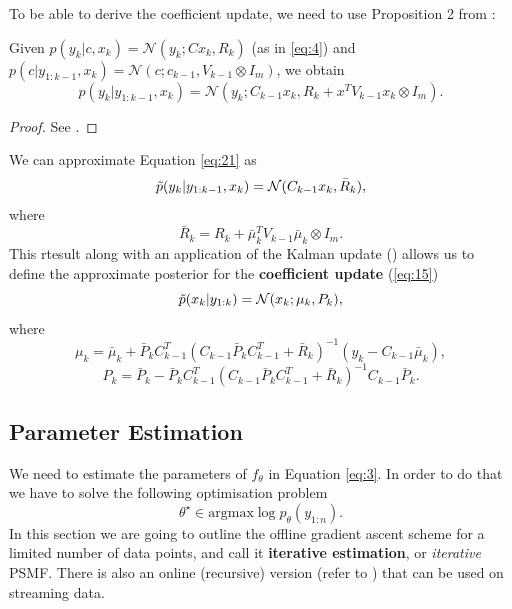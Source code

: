 \documentclass{mldsmsc}
\begin{document}
\noindent To be able to derive the coefficient update, we need to use Proposition 2 from \cite{akyildiz2021probabilistic}:
\begin{proposition}
    Given $p(y_k | c, x_k) = \mathcal{N}(y_k; Cx_k, R_k)$ (as in \ref{eq:4}) and $p(c | y_{1:k-1}, x_k) = \mathcal{N}(c; c_{k-1}, V_{k-1} \otimes I_m)$, we obtain
    \begin{equation}\label{eq:21}
        p(y_k | y_{1:k-1}, x_k) = \mathcal{N}(y_k; C_{k-1} x_k, R_k + x^T V_{k-1} x_k \otimes I_m).
    \end{equation}
\end{proposition}
\begin{proof}
    See \cite{akyildiz2021probabilistic}.
\end{proof}\newline

\noindent We can approximate Equation \ref{eq:21} as
\begin{equation}
    \Tilde{p}(y_k | y_{1:k-1}, x_k) = \mathcal{N}(C_{k-1} x_k, \bar{R}_k),
\end{equation}
where
\begin{equation}
    \bar{R}_k = R_k + \bar{\mu}_k^T V_{k-1} \bar{\mu}_k \otimes I_m.
\end{equation}
This rtesult along with an application of the Kalman update (\cite{anderson1979optimal}) allows us to define the approximate posterior for the \textbf{coefficient update} (\ref{eq:15})
\begin{equation}
    \Tilde{p}(x_k | y_{1:k}) = \mathcal{N}(x_k; \mu_k, P_k),
\end{equation}
where 
\begin{equation}
    \mu_k = \bar{\mu}_k +  \bar{P}_k C_{k-1}^T \left(C_{k-1} \bar{P}_k C_{k-1}^T + \bar{R}_k\right)^{-1} (y_k - C_{k-1} \bar{\mu}_k),
\end{equation}
\begin{equation} \label{eq:6}
    P_k = \bar{P}_k - \bar{P}_k C_{k-1}^T \left(C_{k-1} \bar{P}_k C_{k-1}^T + \bar{R}_k\right)^{-1} C_{k-1} \bar{P}_k.
\end{equation}

\subsection{Parameter Estimation}\label{subsec:param-est-psmf}

We need to estimate the parameters of $f_{\theta}$ in Equation \ref{eq:3}. In order to do that we have to solve the following optimisation problem
\begin{equation}
    \theta^{\star} \in \text{argmax} \log p_{\theta}(y_{1:n}).
\end{equation}
In this section we are going to outline the offline gradient ascent scheme for a limited number of data points, and call it \textbf{iterative estimation}, or \textit{iterative} PSMF. There is also an online (recursive) version (refer to \cite{akyildiz2021probabilistic}) that can be used on streaming data. \newline
\end{document}
